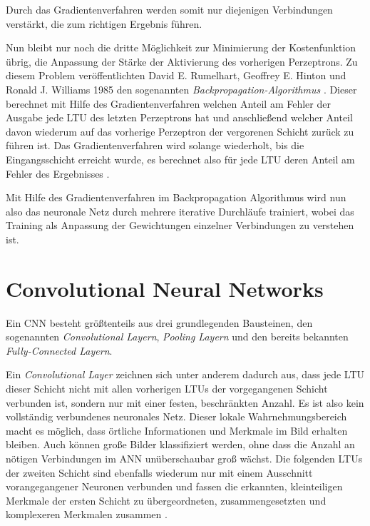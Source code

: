 Durch das Gradientenverfahren werden somit nur diejenigen Verbindungen verstärkt, die zum richtigen Ergebnis führen. 

Nun bleibt nur noch die dritte Möglichkeit zur Minimierung der Kostenfunktion übrig, die Anpassung der Stärke der Aktivierung des vorherigen Perzeptrons. Zu diesem Problem veröffentlichten David E. Rumelhart, Geoffrey E. Hinton und Ronald J. Williams 1985 den sogenannten \textit{Backpropagation-Algorithmus} \cite{DavidE.Rumelhart.September1985}. Dieser berechnet mit Hilfe des Gradientenverfahren welchen Anteil am Fehler der Ausgabe jede LTU des letzten Perzeptrons hat und anschließend welcher Anteil davon wiederum auf das vorherige Perzeptron der vergorenen Schicht zurück zu führen ist. Das Gradientenverfahren wird solange wiederholt, bis die Eingangsschicht erreicht wurde, es berechnet also für jede LTU deren Anteil am Fehler des Ergebnisses \cite{AurelienGeron.2018}.

Mit Hilfe des Gradientenverfahren im Backpropagation Algorithmus wird nun also das neuronale Netz durch mehrere iterative Durchläufe trainiert, wobei das Training als Anpassung der Gewichtungen einzelner Verbindungen zu verstehen ist.

\section*{Convolutional Neural Networks}

Ein CNN besteht größtenteils aus drei grundlegenden Bausteinen, den sogenannten \textit{Convolutional Layern}, \textit{Pooling Layern} und den bereits bekannten \textit{Fully-Connected Layern}.

Ein \textit{Convolutional Layer} zeichnen sich unter anderem dadurch aus, dass jede LTU dieser Schicht nicht mit allen vorherigen LTUs der vorgegangenen Schicht verbunden ist, sondern nur mit einer festen, beschränkten Anzahl. Es ist also kein vollständig verbundenes neuronales Netz. Dieser \glqq lokale Wahrnehmungsbereich\grqq{} macht es möglich, dass örtliche Informationen und Merkmale im Bild erhalten bleiben. Auch können große Bilder klassifiziert werden, ohne dass die Anzahl an nötigen Verbindungen im ANN unüberschaubar groß wächst. Die folgenden LTUs der zweiten Schicht sind ebenfalls wiederum nur mit einem Ausschnitt vorangegangener Neuronen verbunden und fassen die erkannten, kleinteiligen Merkmale der ersten Schicht zu übergeordneten, zusammengesetzten und komplexeren Merkmalen zusammen \cite{AurelienGeron.2018}.

